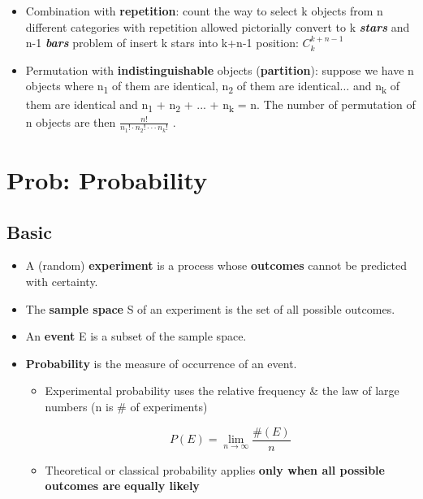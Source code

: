 \documentclass[12pt]{report}
\renewcommand{\_}{\kern-1.5pt\textunderscore\kern-1.5pt}
\begin{document}
\begin{itemize}
	\item Combination with \textbf{repetition}: count the way to select k objects from n different categories with repetition allowed  pictorially convert to k \textbf{\textit{stars}} and n-1 \textbf{\textit{bars}}  problem of insert k stars into k+n-1 position:  \( C_{k}^{k+n-1} \) \par

	\item Permutation with \textbf{indistinguishable} objects (\textbf{partition}): suppose we have n objects where n\textsubscript{1} of them are identical, n\textsubscript{2} of them are identical$ \ldots $  and n\textsubscript{k} of them are identical and n\textsubscript{1} + n\textsubscript{2} + ... + n\textsubscript{k} = n. The number of permutation of n objects are then  \( \frac{n!}{n_{1}! \cdot n_{2}! \cdot  \cdot  \cdot n_{k}!} \) .
\end{itemize}\par

\section*{Prob: Probability}
\subsection*{Basic}
\begin{itemize}
	\item A (random) \textbf{experiment} is a process whose \textbf{outcomes} cannot be predicted with certainty. \par

	\item The \textbf{sample space} S of an experiment is the set of all possible outcomes.\par

	\item An \textbf{event} E is a subset of the sample space.\par

	\item \textbf{Probability} is the measure of occurrence of an event.\par

\begin{itemize}
	\item Experimental probability uses the relative frequency $\&$  the law of large numbers (n is $\#$  of experiments)\par

 \[ P \left( E \right) =\mathop{\lim }_{n \rightarrow \infty}\frac{\# \left( E \right) }{n} \] \par

	\item Theoretical or classical probability applies \textbf{only when all possible outcomes are} \textbf{equally likely}
\end{itemize}
\end{itemize}\par
\end{document}
